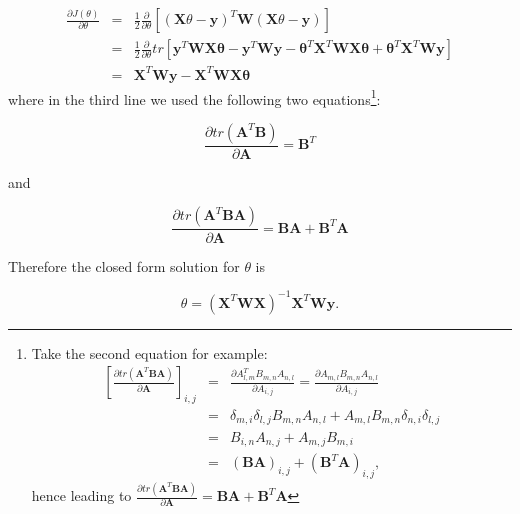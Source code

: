 \documentclass[english,11pt]{article}
\begin{document}
\begin{eqnarray*}
\frac{\partial J(\theta)}{\partial\theta} & = & \frac{1}{2}\frac{\partial}{\partial\theta}\left[(\boldsymbol{X}\theta-\boldsymbol{y})^{T}\boldsymbol{W}(\boldsymbol{X}\theta-\boldsymbol{y})\right]\\
 & = & \frac{1}{2}\frac{\partial}{\partial\theta}tr\left[\boldsymbol{y}^{T}\boldsymbol{W}\boldsymbol{X}\boldsymbol{\theta}-\boldsymbol{y}^{T}\boldsymbol{W}\boldsymbol{y}-\boldsymbol{\theta}^{T}\boldsymbol{X}^{T}\boldsymbol{W}\boldsymbol{X}\boldsymbol{\theta}+\boldsymbol{\theta}^{T}\boldsymbol{X}^{T}\boldsymbol{W}\boldsymbol{y}\right]\\
 & = & \boldsymbol{X}^{T}\boldsymbol{W}\boldsymbol{y}-\boldsymbol{X}^{T}\boldsymbol{W}\boldsymbol{X}\boldsymbol{\theta}
\end{eqnarray*}
where in the third line we used the following two equations\footnote{Take the second equation for example: 
\begin{eqnarray*}
\left[\frac{\partial tr(\boldsymbol{A}^{T}\boldsymbol{B}\boldsymbol{A})}{\partial\boldsymbol{A}}\right]_{i,j} & = & \frac{\partial A_{l,m}^{T}B_{m,n}A_{n,l}}{\partial A_{i,j}}=\frac{\partial A_{m,l}B_{m,n}A_{n,l}}{\partial A_{i,j}}\\
 & = & \delta_{m,i}\delta_{l,j}B_{m,n}A_{n,l}+A_{m,l}B_{m,n}\delta_{n,i}\delta_{l,j}\\
 & = & B_{i,n}A_{n,j}+A_{m,j}B_{m,i}\\
 & = & (\boldsymbol{B}\boldsymbol{A})_{i,j}+(\boldsymbol{B}^{T}\boldsymbol{A})_{i,j},
\end{eqnarray*}
hence leading to $\frac{\partial tr(\boldsymbol{A}^{T}\boldsymbol{B}\boldsymbol{A})}{\partial\boldsymbol{A}}=\boldsymbol{B}\boldsymbol{A}+\boldsymbol{B}^{T}\boldsymbol{A}$}:

\begin{equation}
\frac{\partial tr(\boldsymbol{A}^{T}\boldsymbol{B})}{\partial\boldsymbol{A}}=\boldsymbol{B}^{T}
\end{equation}

and 

\begin{equation}
\frac{\partial tr(\boldsymbol{A}^{T}\boldsymbol{B}\boldsymbol{A})}{\partial\boldsymbol{A}}=\boldsymbol{B}\boldsymbol{A}+\boldsymbol{B}^{T}\boldsymbol{A}    
\end{equation}

Therefore the closed form solution for $\theta$ is

\begin{equation}
\theta=(\boldsymbol{X}^{T}\boldsymbol{W}\boldsymbol{X})^{-1}\boldsymbol{X}^{T}\boldsymbol{W}\boldsymbol{y}.    
\end{equation}
\end{document}
